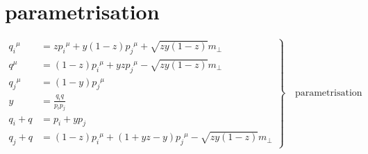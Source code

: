 \section{parametrisation}

	
\begin{equation}
	\left.\begin{aligned}
	{q_i}^{\mu} &= z{p_i}^{\mu} + y(1-z){p_j}^{\mu} + \sqrt{zy(1-z)}{m}_{\bot} \\
	{q}^{\mu}   &= (1-z){p_i}^{\mu} + yz {p_j}^{\mu} - \sqrt{zy(1-z)}{m}_{\bot} \\
	{q_j}^{\mu} &= (1-y) {p_j}^{\mu} \\
		y       &= \frac{q_i q}{p_i p_j} \\
q_i +q      &= p_i + yp_j \\
q_j +q      &= (1-z){p_i}^{\mu} + (1+yz-y) {p_j}^{\mu} - \sqrt{zy(1-z)}{m}_{\bot}
		\end{aligned}
	\right\}
	\quad \text{parametrisation}
\end{equation}

\newpage